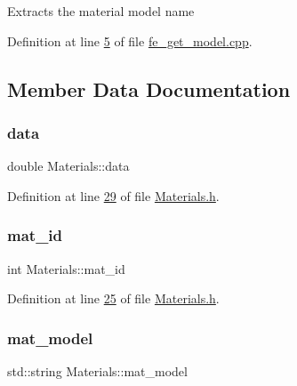 Extracts the material model name 

Definition at line \hyperlink{fe__get__model_8cpp_source_l00005}{5} of file \hyperlink{fe__get__model_8cpp_source}{fe\+\_\+get\+\_\+model.\+cpp}.



\subsection{Member Data Documentation}
\mbox{\label{class_materials_ae1d76dc4fa0500285c6759f55038e4c6}} 
\subsubsection{\texorpdfstring{data}{data}}
{\footnotesize\ttfamily double Materials\+::data\hspace{0.3cm}{\ttfamily [private]}}



Definition at line \hyperlink{_materials_8h_source_l00029}{29} of file \hyperlink{_materials_8h_source}{Materials.\+h}.

\mbox{\label{class_materials_a9687f294a4ae4b2603eed657ee7dbebf}} 
\subsubsection{\texorpdfstring{mat\+\_\+id}{mat\_id}}
{\footnotesize\ttfamily int Materials\+::mat\+\_\+id\hspace{0.3cm}{\ttfamily [private]}}



Definition at line \hyperlink{_materials_8h_source_l00025}{25} of file \hyperlink{_materials_8h_source}{Materials.\+h}.

\mbox{\label{class_materials_abe8d649257d71769de7a3aa20ff8977e}} 
\subsubsection{\texorpdfstring{mat\+\_\+model}{mat\_model}}
{\footnotesize\ttfamily std\+::string Materials\+::mat\+\_\+model\hspace{0.3cm}{\ttfamily [private]}}



